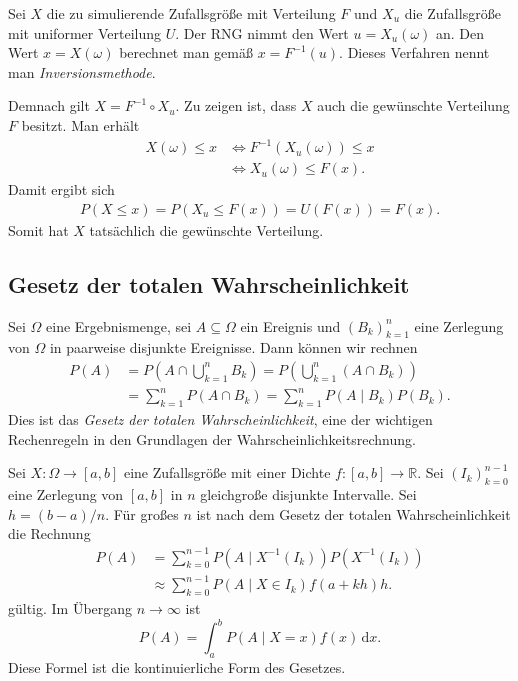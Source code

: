 \documentclass[a4paper,10pt,fleqn,twocolumn,twoside,dvipdfmx]{scrartcl}
\numberwithin{equation}{section}
\newcommand{\R}{\mathbb R}
\theoremstyle{rmbox}
\begin{document}
Sei $X$ die zu simulierende Zufallsgröße mit Verteilung $F$
und $X_u$ die Zufallsgröße mit uniformer Verteilung $U$. Der RNG
nimmt den Wert $u=X_u(\omega)$ an. Den Wert $x=X(\omega)$ berechnet
man gemäß $x=F^{-1}(u)$. Dieses Verfahren nennt man
\emph{Inversionsmethode}.

Demnach gilt $X=F^{-1}\circ X_u$. Zu zeigen ist, dass $X$ auch
die gewünschte Verteilung $F$ besitzt. Man erhält
\begin{align}
X(\omega)\le x&\iff F^{-1}(X_u(\omega))\le x\\
&\iff X_u(\omega)\le F(x).
\end{align}
Damit ergibt sich
\begin{gather}
P(X\le x) = P(X_u\le F(x)) = U(F(x)) = F(x).
\end{gather}
Somit hat $X$ tatsächlich die gewünschte Verteilung.

\subsection{Gesetz der totalen Wahrscheinlichkeit}

Sei $\Omega$ eine Ergebnismenge, sei $A\subseteq\Omega$ ein
Ereignis und $(B_k)_{k=1}^n$ eine Zerlegung von $\Omega$ in
paarweise disjunkte Ereignisse. Dann können wir rechnen
\begin{align*}
P(A) &= P(A\cap\bigcup_{k=1}^n B_k) = 
P(\bigcup_{k=1}^n (A\cap B_k))\\
&= \sum_{k=1}^n P(A\cap B_k)
= \sum_{k=1}^n P(A\mid B_k)P(B_k).
\end{align*}
Dies ist das \emph{Gesetz der totalen Wahrscheinlichkeit}, eine der
wichtigen Rechenregeln in den Grundlagen der
Wahrscheinlichkeitsrechnung.

Sei $X\colon\Omega\to [a,b]$ eine Zufallsgröße mit einer
Dichte $f\colon [a,b]\to \R$. Sei
$(I_k)_{k=0}^{n-1}$ eine Zerlegung von $[a,b]$ in $n$ gleichgroße
disjunkte Intervalle. Sei $h=(b-a)/n$. Für großes $n$
ist nach dem Gesetz der totalen Wahrscheinlichkeit die Rechnung
\begin{align*}
P(A) &= \sum_{k=0}^{n-1} P(A\mid X^{-1}(I_k))P(X^{-1}(I_k))\\
&\approx \sum_{k=0}^{n-1} P(A\mid X\in I_k)f(a+kh)h.
\end{align*}
gültig. Im Übergang $n\to\infty$ ist
\begin{equation}
P(A) = \int_a^b P(A\mid X=x)f(x)\,\mathrm dx.
\end{equation}
Diese Formel ist die kontinuierliche Form des Gesetzes.
\end{document}

